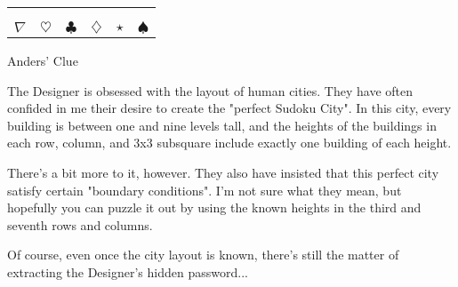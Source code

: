 \documentclass{article}
\begin{document}
\vspace{3em}

\begin{center}
\begin{tabular}{c c c c c c}
 & \\
\underline{\phantom{xyz}} & \underline{\phantom{xyz}} & \underline{\phantom{xyz}} & \underline{\phantom{xyz}} & \underline{\phantom{xyz}} & \underline{\phantom{xyz}}\\
$\nabla$ & $\heartsuit$ & $\clubsuit$ & $\diamondsuit$ & $\star$ & $\spadesuit$
\end{tabular}
\end{center}

\newpage

Anders' Clue

The Designer is obsessed with the layout of human cities.
They have often confided in me their desire to create the
"perfect Sudoku
City". In this city, every building is between one and nine levels
tall, and the heights of the buildings in each row, column, and
3x3 subsquare include exactly one building of each height.

There's a bit more to it, however. They also have insisted that
this perfect city satisfy certain "boundary conditions". I'm
not sure what they mean, but hopefully you can puzzle it out by using
the known heights in the third and seventh rows and columns.

Of course, even once the city layout is known, there's still the matter
of extracting the Designer's hidden password...
\end{document}
